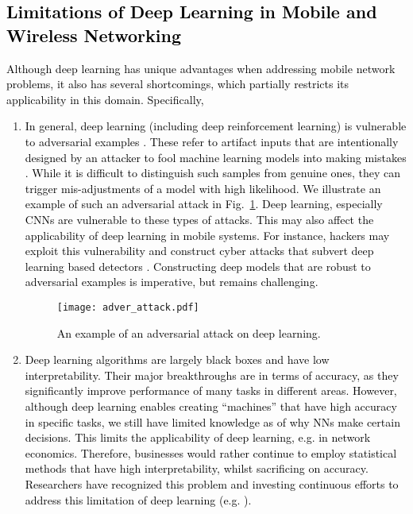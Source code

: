 \documentclass[journal,comsoc,letter]{IEEEtran}
\newcommand{\rev}[1]{\textcolor{black}{#1}}
\begin{document}
\subsection{\rev{Limitations of Deep Learning in Mobile and Wireless Networking} \label{sec:limit}}
\rev{Although deep learning has unique advantages when addressing mobile network problems, it also has several shortcomings, which partially restricts its applicability in this domain. Specifically, }
\begin{enumerate}
    \item \rev{In general, deep learning (including deep reinforcement learning) is vulnerable to adversarial examples \cite{nguyen2015deep, behzadan2017vulnerability}. These refer to artifact inputs that are intentionally designed by an attacker to fool machine learning models into making mistakes \cite{nguyen2015deep}. While it is difficult to distinguish such samples from genuine ones, they can trigger mis-adjustments of a model with high likelihood. We illustrate an example of such an adversarial attack in Fig.~\ref{fig:adver_attack}. Deep learning, especially CNNs are vulnerable to these types of attacks. This may also affect the applicability of deep learning in mobile systems. For instance, hackers may exploit this vulnerability and construct cyber attacks that subvert deep learning based detectors \cite{madani2018robustness}. Constructing deep models that are robust to adversarial examples is imperative, but remains challenging. }
\begin{figure}[htb]
\begin{center}
\texttt{[image: adver\_attack.pdf]}
\end{center}
\caption{\label{fig:adver_attack} \rev{An example of an adversarial attack on deep learning.}}
\end{figure}
    \item \rev{Deep learning algorithms are largely black boxes and have low interpretability. Their major breakthroughs are in terms of accuracy, as they significantly improve performance of many tasks in different areas. However, although deep learning enables creating ``machines'' that have high accuracy in specific tasks, we still have limited knowledge as of why NNs make certain decisions. This limits the applicability of deep learning, e.g. in network economics. Therefore, businesses would rather continue to employ statistical methods that have high interpretability, whilst sacrificing on accuracy. Researchers have recognized this problem and investing continuous efforts to address this limitation of deep learning (e.g. \cite{bau2017network, wu2017beyond, chakraborty2017interpretability}).}

\end{enumerate}
\end{document}
